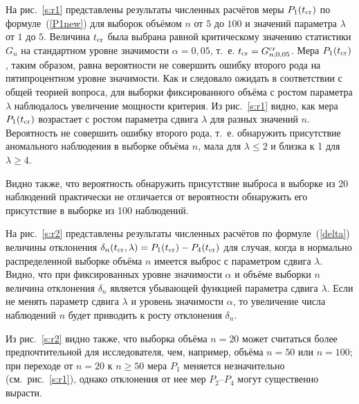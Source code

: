 На рис.~\ref{s:r1} представлены результаты  численных расчётов меры $P_1(t_{\rm cr})$ по формуле~(\ref{P1new})
для выборок объёмом  $n$ от $5$ до $100$ и значений  параметра $\lambda$ от $1$ до $5$.
Величина $t_{\rm cr}$ была выбрана равной критическому значению статистики
$G_{n}$ на стандартном уровне значимости $\alpha=0,05$, т.~е.
$t_{\rm cr}=G_{n;0,05}^{\rm cr}$.
 Мера $P_1(t_{\rm cr})$, таким образом, равна вероятности не совершить ошибку второго рода на пятипроцентном уровне значимости.
 Как и следовало ожидать в соответствии с общей теорией вопроса,  для  выборки фиксированного объёма с ростом параметра $\lambda$ наблюдалось увеличение мощности критерия.
 Из рис.~\ref{s:r1} видно, как мера $P_1(t_{\rm cr})$ возрастает с ростом
параметра сдвига $\lambda$ для разных значений  $n$. Вероятность не совершить ошибку второго рода, т.~е. обнаружить присутствие аномального наблюдения в выборке  объёма $n$, мала для $\lambda\le 2$ и близка к 1 для $\lambda\ge 4$.
 
    Видно также, что вероятность обнаружить присутствие выброса в  выборке из $20$ наблюдений  практически не отличается от вероятности обнаружить его присутствие в выборке из 100 наблюдений.

 На рис.~\ref{s:r2} представлены результаты  численных расчётов по формуле~(\ref{delta}) величины отклонения
 $\delta_n(t_{\rm cr},\lambda)=P_1(t_{\rm cr})-P_4(t_{\rm cr})$ для случая, когда 
 в нормально распределенной выборке объёма $n$  имеется выброс с параметром сдвига $\lambda$.
 Видно, что при фиксированных уровне значимости $\alpha$ и объёме выборки  $n$ величина отклонения $\delta_n$
 является убывающей функцией параметра сдвига $\lambda$.
  Если не менять параметр сдвига $\lambda$ и уровень значимости $\alpha$, то 
   увеличение числа наблюдений $n$ будет приводить к росту отклонения $\delta_n$.
 
     
Из рис.~\ref{s:r2} видно также, что выборка объёма $n=20$ может считаться более предпочтительной для исследователя, чем, например, объёма
$n=50$ или $n=100$; при переходе от $n=20$ к $n\ge 50$  мера $P_1$ меняется незначительно (см.~рис.~\ref{s:r1}), однако отклонения от нее мер $P_2$--$P_4$ могут существенно вырасти.

\smallskip

